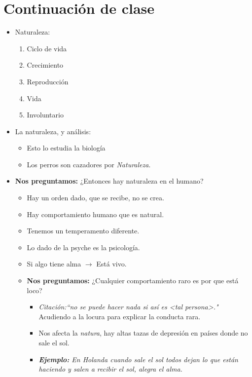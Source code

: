 \section{Continuación de clase}
\begin{itemize}
    \item Naturaleza:
        \begin{enumerate}
            \item Ciclo de vida 
            \item Crecimiento 
            \item Reproducción 
            \item Vida  
            \item Involuntario 
        \end{enumerate}
    
    \item La naturaleza, y análisis: 
        \begin{itemize}
            \item Esto lo estudia la biología
            \item Los perros son cazadores por \emph{Naturaleza}.
        \end{itemize}
    
    \item \textbf{Nos preguntamos:} ¿Entonces hay naturaleza en el humano?
        \begin{itemize}
            \item Hay un orden dado, que se recibe, no se crea.
            \item Hay comportamiento humano que es natural.
            \item Tenemos un temperamento diferente.
            \item Lo dado de la psyche es la psicología.
            \item Si algo tiene alma $\rightarrow$ Está vivo.
            \item \textbf{Nos preguntamos:} ¿Cualquier comportamiento raro es por que está loco? 
                \begin{itemize}
                    \item \emph{Citación:``no se puede hacer nada si así es <tal persona>."} Acudiendo a la locura para explicar la conducta rara.
                    \item Nos afecta la \emph{natura}, hay altas tazas de depresión en países donde no sale el sol.
                    \item \emph{\textbf{Ejemplo: }En Holanda cuando sale el sol todos dejan lo que están haciendo y salen a recibir el sol, alegra el alma. }
                \end{itemize}
        \end{itemize}
    

\end{itemize}
